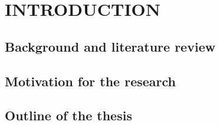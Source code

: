 \section{INTRODUCTION} \label{sec:itroduction}

\subsection{Background and literature review}
\subsection{Motivation for the research}

\subsection{Outline of the thesis}


